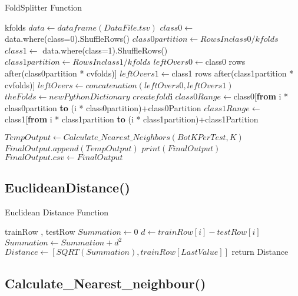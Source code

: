 \documentclass{article}
\begin{document}
\begin{algorithm}[H]
\caption{FoldSplitter Function}
\begin{algorithmic}[1]
\REQUIRE kfolds  
\STATE $ data \gets dataframe(DataFile.tsv)$
\STATE $ class0 \gets $  data.where(class=0).ShuffleRows() 
\STATE $ class0partition \gets  Rows In class0 / kfolds $
\STATE $ class1 \gets $ data.where(class=1).ShuffleRows()
\STATE $ class1partition \gets  Rows In class1 / kfolds $
\STATE $ leftOvers0 \gets $class0 rows after(class0partition * cvfolds)]
\STATE $ leftOvers1 \gets $class1 rows after(class1partition * cvfolds)]
\STATE $ leftOvers \gets  concatenation(leftOvers0,leftOvers1)$
\STATE $ theFolds \gets newPythonDictionary$
        \STATE  $create fold\textbf{i} $  
      	\STATE $class0Range \gets $class0[\textbf{from} i * class0partition \textbf{to} (i * class0partition)+class0Partition  
      	\STATE $class1Range \gets$ class1[\textbf{from} i * class1partition \textbf{to} (i * class1partition)+class1Partition   

      	\STATE $TempOutput \gets Calculate\_Nearest\_Neighbors(BotKPerTest, K)$
      	\STATE $FinalOutput.append(TempOutput)$ 
      	\STATE $print(FinalOutput)$  
      \ENDFOR
      \STATE $FinalOutput.csv \gets FinalOutput $
\end{algorithmic}
\end{algorithm}

 \subsection{EuclideanDistance()}
\begin{algorithm}[H]
\caption{Euclidean Distance Function}
\begin{algorithmic}[1]
\REQUIRE trainRow , testRow 
\STATE $ Summation \gets 0	 $
        \STATE $d \gets trainRow[i] - testRow[i]$
        \STATE $Summation \gets Summation + d^{2}$
  	\ENDFOR
\STATE $Distance \gets [SQRT(Summation) , trainRow[LastValue] ]$  
\STATE return Distance

\end{algorithmic}
\end{algorithm}


 \subsection{Calculate\_Nearest\_neighbour()}
 
\end{document}

